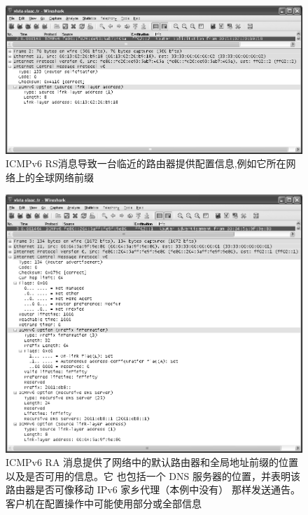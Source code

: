 \begin{figure}[H]
  \centering
  \includegraphics[scale=0.5]{imgs/6/6-24.png}
  \caption{ ICMPv6 RS消息导致一台临近的路由器提供配置信息,例如它所在网络上的全球网络前缀}
\end{figure}

\begin{figure}[H]
  \centering
  \includegraphics[scale=0.5]{imgs/6/6-25.png}
  \caption{ICMPv6 RA 消息提供了网络中的默认路由器和全局地址前缀的位置以及是否可用的信息。它
    也包括一个 DNS 服务器的位置，并表明该路由器是否可像移动 IPv6 家乡代理（本例中没有）
  那样发送通告。客户机在配置操作中可能使用部分或全部信息}
\end{figure}

